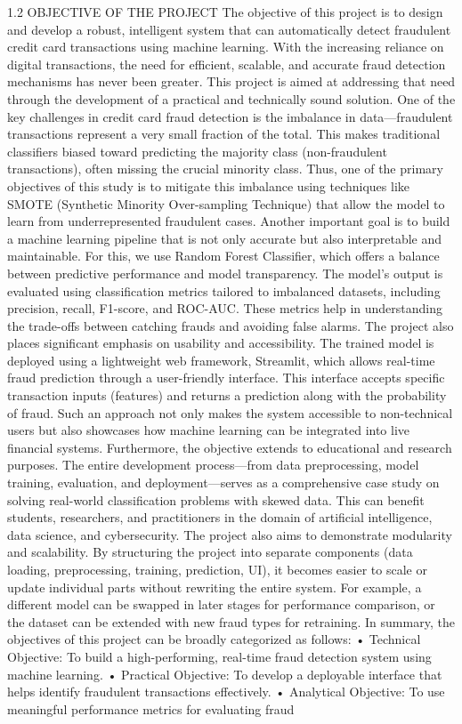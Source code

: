 \documentclass[11pt,a4paper]{article}
\begin{document}
1.2 OBJECTIVE OF THE PROJECT 
The objective of this project is to design and develop a robust, intelligent system that can 
automatically detect fraudulent credit card transactions using machine learning. With the 
increasing reliance on digital transactions, the need for efficient, scalable, and accurate fraud 
detection mechanisms has never been greater. This project is aimed at addressing that need 
through the development of a practical and technically sound solution. 
One of the key challenges in credit card fraud detection is the imbalance in data—fraudulent 
transactions represent a very small fraction of the total. This makes traditional classifiers 
biased toward predicting the majority class (non-fraudulent transactions), often missing the 
crucial minority class. Thus, one of the primary objectives of this study is to mitigate this 
imbalance using techniques like SMOTE (Synthetic Minority Over-sampling Technique) 
that allow the model to learn from underrepresented fraudulent cases. 
Another important goal is to build a machine learning pipeline that is not only accurate but 
also interpretable and maintainable. For this, we use Random Forest Classifier, which offers 
a balance between predictive performance and model transparency. The model's output is 
evaluated using classification metrics tailored to imbalanced datasets, including precision, 
recall, F1-score, and ROC-AUC. These metrics help in understanding the trade-offs between 
catching frauds and avoiding false alarms. 
The project also places significant emphasis on usability and accessibility. The trained 
model is deployed using a lightweight web framework, Streamlit, which allows real-time 
fraud prediction through a user-friendly interface. This interface accepts specific transaction 
inputs (features) and returns a prediction along with the probability of fraud. Such an 
approach not only makes the system accessible to non-technical users but also showcases 
how machine learning can be integrated into live financial systems. 
Furthermore, the objective extends to educational and research purposes. The entire 
development process—from data preprocessing, model training, evaluation, and 
deployment—serves as a comprehensive case study on solving real-world classification 
problems with skewed data. This can benefit students, researchers, and practitioners in the 
domain of artificial intelligence, data science, and cybersecurity. 
The project also aims to demonstrate modularity and scalability. By structuring the project 
into separate components (data loading, preprocessing, training, prediction, UI), it becomes 
easier to scale or update individual parts without rewriting the entire system. For example, a 
different model can be swapped in later stages for performance comparison, or the dataset 
can be extended with new fraud types for retraining. 
In summary, the objectives of this project can be broadly categorized as follows: 
• 
Technical Objective: To build a high-performing, real-time fraud detection system 
using machine learning. 
• 
Practical Objective: To develop a deployable interface that helps identify fraudulent 
transactions effectively. 
• 
Analytical Objective: To use meaningful performance metrics for evaluating fraud 
\end{document}
